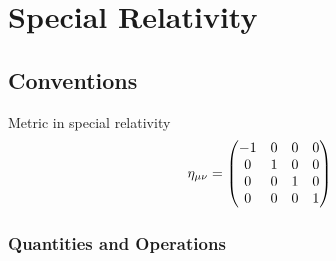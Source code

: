 \documentclass[letterpaper,10pt,english]{sphinxmanual}
\begin{document}
{\section{Special Relativity}
\label{SpecialRelativity::doc}\label{SpecialRelativity:special-relativity}

\subsection{Conventions}
\label{SpecialRelativity:conventions}
Metric in special relativity
\begin{gather}
\begin{split}\begin{equation}\eta_{\mu\nu}=\left(\begin{matrix}
     -1 & 0 & 0 & 0\\
     0 & 1 & 0 & 0\\
     0 & 0 & 1 & 0\\
     0 & 0 & 0 & 1\\
\end{matrix}\right)\end{equation}\end{split}\notag
\end{gather}

\subsubsection{Quantities and Operations}
\label{SpecialRelativity:quantities-and-operations}

}
\end{document}
